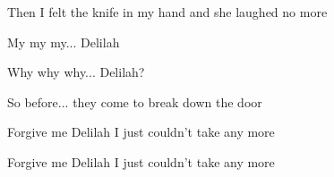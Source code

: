 Then I felt the knife in my hand and she laughed no more


My my my... Delilah

Why why why... Delilah?

So before... they come to break down the door

Forgive me Delilah I just couldn’t take any more

Forgive me Delilah I just couldn’t take any more 



